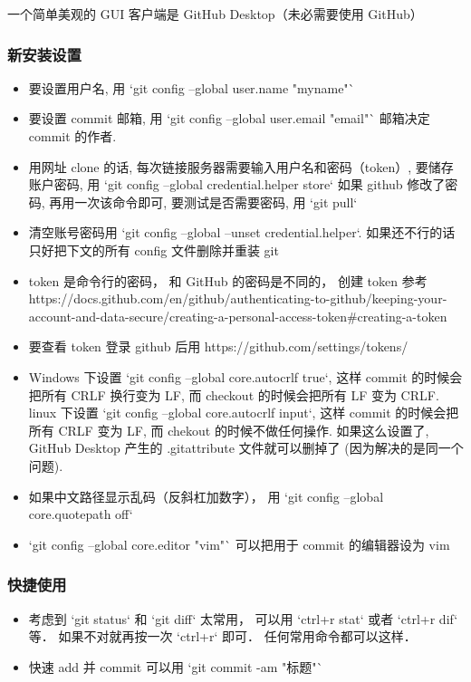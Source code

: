 

一个简单美观的 GUI 客户端是 GitHub Desktop（未必需要使用 GitHub）

\subsubsection{新安装设置}
\begin{itemize}
\item 要设置用户名, 用 `git config --global user.name "myname"`
\item 要设置 commit 邮箱, 用 `git config --global user.email "email"`  邮箱决定 commit 的作者.
\item 用网址 clone 的话, 每次链接服务器需要输入用户名和密码（token）, 要储存账户密码, 用 `git config --global credential.helper store` 如果 github 修改了密码, 再用一次该命令即可, 要测试是否需要密码, 用 `git pull`
\item 清空账号密码用 `git config --global --unset credential.helper`. 如果还不行的话只好把下文的所有 config 文件删除并重装 git
\item token 是命令行的密码， 和 GitHub 的密码是不同的， 创建 token 参考 https://docs.github.com/en/github/authenticating-to-github/keeping-your-account-and-data-secure/creating-a-personal-access-token#creating-a-token
\item 要查看 token 登录 github 后用 https://github.com/settings/tokens/
\item Windows 下设置 `git config --global core.autocrlf true`, 这样 commit 的时候会把所有 CRLF 换行变为 LF, 而 checkout 的时候会把所有 LF 变为 CRLF. linux 下设置 `git config --global core.autocrlf input`, 这样 commit 的时候会把所有 CRLF 变为 LF, 而 chekout 的时候不做任何操作. 如果这么设置了, GitHub Desktop 产生的 .gitattribute 文件就可以删掉了 (因为解决的是同一个问题).
\item 如果中文路径显示乱码（反斜杠加数字）， 用 `git config --global core.quotepath off`
\item `git config --global core.editor "vim"` 可以把用于 commit 的编辑器设为 vim
\end{itemize}

\subsubsection{快捷使用}
\begin{itemize}
\item 考虑到 `git status` 和 `git diff` 太常用， 可以用 `ctrl+r stat` 或者 `ctrl+r dif` 等． 如果不对就再按一次 `ctrl+r` 即可． 任何常用命令都可以这样．
\item 快速 add 并 commit 可以用 `git commit -am "标题"`
\end{itemize}

